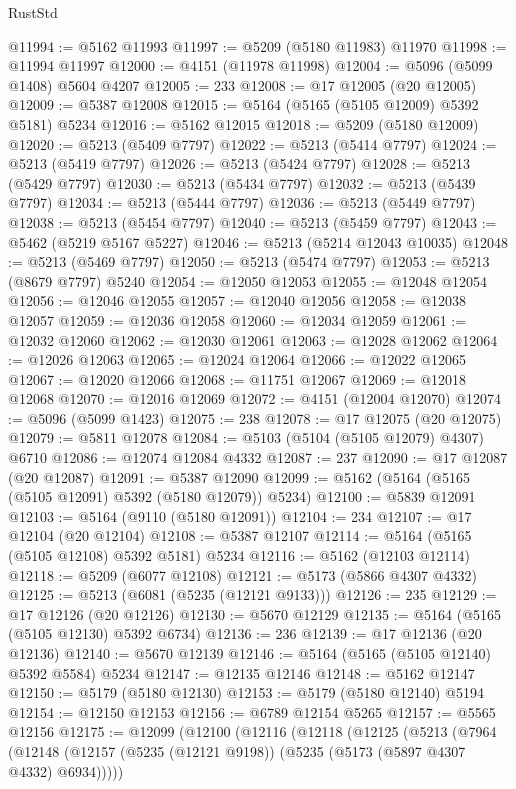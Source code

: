 \begin{lexlean}{RustStd}
\begin{coremodule}
@11994 := @5162 @11993
@11997 := @5209 (@5180 @11983) @11970
@11998 := @11994 @11997
@12000 := @4151 (@11978 @11998)
@12004 := @5096 (@5099 @1408) @5604 @4207
@12005 := 233
@12008 := @17 @12005 (@20 @12005)
@12009 := @5387 @12008
@12015 := @5164 (@5165 (@5105 @12009) @5392 @5181) @5234
@12016 := @5162 @12015
@12018 := @5209 (@5180 @12009)
@12020 := @5213 (@5409 @7797)
@12022 := @5213 (@5414 @7797)
@12024 := @5213 (@5419 @7797)
@12026 := @5213 (@5424 @7797)
@12028 := @5213 (@5429 @7797)
@12030 := @5213 (@5434 @7797)
@12032 := @5213 (@5439 @7797)
@12034 := @5213 (@5444 @7797)
@12036 := @5213 (@5449 @7797)
@12038 := @5213 (@5454 @7797)
@12040 := @5213 (@5459 @7797)
@12043 := @5462 (@5219 @5167 @5227)
@12046 := @5213 (@5214 @12043 @10035)
@12048 := @5213 (@5469 @7797)
@12050 := @5213 (@5474 @7797)
@12053 := @5213 (@8679 @7797) @5240
@12054 := @12050 @12053
@12055 := @12048 @12054
@12056 := @12046 @12055
@12057 := @12040 @12056
@12058 := @12038 @12057
@12059 := @12036 @12058
@12060 := @12034 @12059
@12061 := @12032 @12060
@12062 := @12030 @12061
@12063 := @12028 @12062
@12064 := @12026 @12063
@12065 := @12024 @12064
@12066 := @12022 @12065
@12067 := @12020 @12066
@12068 := @11751 @12067
@12069 := @12018 @12068
@12070 := @12016 @12069
@12072 := @4151 (@12004 @12070)
@12074 := @5096 (@5099 @1423)
@12075 := 238
@12078 := @17 @12075 (@20 @12075)
@12079 := @5811 @12078
@12084 := @5103 (@5104 (@5105 @12079) @4307) @6710
@12086 := @12074 @12084 @4332
@12087 := 237
@12090 := @17 @12087 (@20 @12087)
@12091 := @5387 @12090
@12099 := @5162 (@5164 (@5165 (@5105 @12091) @5392 (@5180 @12079)) @5234)
@12100 := @5839 @12091
@12103 := @5164 (@9110 (@5180 @12091))
@12104 := 234
@12107 := @17 @12104 (@20 @12104)
@12108 := @5387 @12107
@12114 := @5164 (@5165 (@5105 @12108) @5392 @5181) @5234
@12116 := @5162 (@12103 @12114)
@12118 := @5209 (@6077 @12108)
@12121 := @5173 (@5866 @4307 @4332)
@12125 := @5213 (@6081 (@5235 (@12121 @9133)))
@12126 := 235
@12129 := @17 @12126 (@20 @12126)
@12130 := @5670 @12129
@12135 := @5164 (@5165 (@5105 @12130) @5392 @6734)
@12136 := 236
@12139 := @17 @12136 (@20 @12136)
@12140 := @5670 @12139
@12146 := @5164 (@5165 (@5105 @12140) @5392 @5584) @5234
@12147 := @12135 @12146
@12148 := @5162 @12147
@12150 := @5179 (@5180 @12130)
@12153 := @5179 (@5180 @12140) @5194
@12154 := @12150 @12153
@12156 := @6789 @12154 @5265
@12157 := @5565 @12156
@12175 := @12099
    (@12100
      (@12116
        (@12118
          (@12125
            (@5213
              (@7964
                (@12148 (@12157 (@5235 (@12121 @9198)) (@5235 (@5173 (@5897 @4307 @4332) @6934)))))

\end{coremodule}
\end{lexlean}
